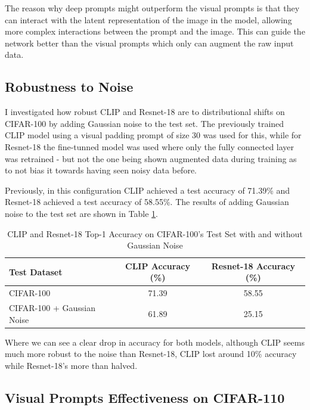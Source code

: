 \documentclass[a4paper]{article}
\begin{document}
The reason why deep prompts might outperform the visual prompts is that they can interact with the latent
representation of the image in the model, allowing more complex interactions between the prompt and the image. This
can guide the network better than the visual prompts which only can augment the raw input data.

\subsection{Robustness to Noise}
I investigated how robust CLIP and Resnet-18 are to distributional shifts on CIFAR-100 by adding Gaussian noise to
the test set. The previously trained CLIP model using a visual padding prompt of size 30 was used for this, while
for Resnet-18 the fine-tunned model was used where only the fully connected layer was retrained - but not the one
being shown augmented data during training as to not bias it towards having seen noisy data before.

Previously, in this configuration CLIP achieved a test accuracy of 71.39\% and Resnet-18 achieved a test accuracy
of 58.55\%. The results of adding Gaussian noise to the test set are shown in Table \ref{tab:robustness}.

\begin{table}[h]
    \centering
    \begin{tabular}{|l|c|c|}
    \hline
    \rowcolor{Gray}
    \textbf{Test Dataset} & \textbf{CLIP Accuracy (\%)} & \textbf{Resnet-18 Accuracy (\%)} \\ \hline
    CIFAR-100 & 71.39 & 58.55 \\ \hline
    CIFAR-100 + Gaussian Noise & 61.89 & 25.15 \\ \hline
    \end{tabular}
    \caption{CLIP and Resnet-18 Top-1 Accuracy on CIFAR-100's Test Set with and without Gaussian Noise}
    \label{tab:robustness}
\end{table}

Where we can see a clear drop in accuracy for both models, although CLIP seems much more robust to the noise than
Resnet-18, CLIP lost around 10\% accuracy while Resnet-18's more than halved.
\bigskip

\subsection{Visual Prompts Effectiveness on CIFAR-110}
\end{document}

